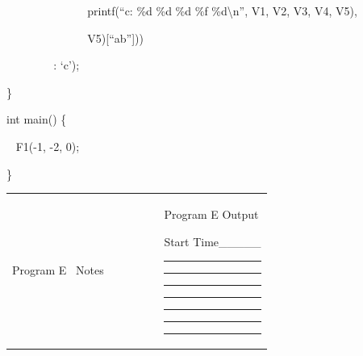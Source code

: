 \documentclass[12pt, a4paper, oneside]{article}
\begin{document}
{~ ~ ~ ~ ~ ~ ~ ~ ~printf(``c: \%d \%d \%d \%f \%d\textbackslash{}n'',
V1, V2, V3, V4, V5),}

{~ ~ ~ ~ ~ ~ ~ ~ ~V5){[}``ab''{]}))}

{~ ~ ~ ~ ~ : `c');}

{\}}

{}

{int main() \{}

{~ F1(-1, -2, 0);}

{\}}

{}

{}

\begin{longtable}[]{@{}ll@{}}
\toprule
\begin{minipage}[t]{0.47\columnwidth}\raggedright\strut
{Program E ~Notes ~~~~~~~~}
\strut\end{minipage} &
\begin{minipage}[t]{0.47\columnwidth}\raggedright\strut
{Program E Output}

{}

{}

{Start Time\_\_\_\_\_}

{}

\begin{center}\rule{0.5\linewidth}{\linethickness}\end{center}

{}

\begin{center}\rule{0.5\linewidth}{\linethickness}\end{center}

{}

\begin{center}\rule{0.5\linewidth}{\linethickness}\end{center}

{}

\begin{center}\rule{0.5\linewidth}{\linethickness}\end{center}

{}

\begin{center}\rule{0.5\linewidth}{\linethickness}\end{center}

{}

\begin{center}\rule{0.5\linewidth}{\linethickness}\end{center}

{}

\begin{center}\rule{0.5\linewidth}{\linethickness}\end{center}


\end{minipage}
\end{longtable}
\end{document}
